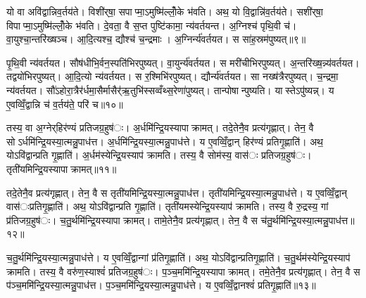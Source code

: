 
यो वा अवि॑द्वान्निव॒र्तय॑ते। विशी॑र्‌षा॒ सपाप्मा॒ऽमुष्मि॑ल्लोँ॒के भ॑वति। अथ॒ यो वि॒द्वान्नि॑व॒र्तय॑ते। सशी॑र्‌षा॒ विपाप्मा॒ऽमुष्मि॑ल्लोँ॒के भ॑वति। दे॒वता॒ वै स॒प्त पुष्टि॑कामा॒ न्य॑वर्तयन्त। अ॒ग्निश्च॑ पृथि॒वी च॑। वा॒युश्चा॒न्तरि॑ख्षञ्च। आ॒दि॒त्यश्च॒ द्यौश्च॑ च॒न्द्रमाः। अ॒ग्निर्न्य॑वर्तयत। स सा॑ह॒स्रम॑पुष्यत्॥९॥

पृ॒थि॒वी न्य॑वर्तयत। सौष॑धीभि॒र्वन॒स्पति॑भिरपुष्यत्। वा॒युर्न्य॑वर्तयत। स मरी॑चीभिरपुष्यत्। अ॒न्तरि॑ख्ष॒न्न्य॑वर्तयत। तद्वयो॑भिरपुष्यत्। आ॒दि॒त्यो न्य॑वर्तयत। स र॒श्मिभि॑रपुष्यत्। द्यौर्न्य॑वर्तयत। सा नख्ष॑त्रैरपुष्यत्। च॒न्द्रमा॒ न्य॑वर्तयत। सौ॑ऽहोरा॒त्रैर॑र्धमा॒सैर्मासैर्॑ऋ॒तुभि॑स्सव्वँथ्स॒रेणा॑पुष्यत्। तान्पोषान्पुष्यति। यास्तेऽपु॑ष्यन्न्। य ए॒वव्विँ॒द्वान्नि च॑ व॒र्तय॑ते॒ परि॑ च॥१०॥


तस्य॒ वा अ॒ग्नेर्‌हिर॑ण्यं प्रतिजग्र॒हुष॑ः। अ॒र्धमि॑न्द्रि॒यस्यापाक्रामत्। तदे॒तेनै॒व प्रत्य॑गृह्णात्। तेन॒ वै सोऽर्धमि॑न्द्रि॒यस्या॒त्मन्नु॒पाध॑त्त। अ॒र्धमि॑न्द्रि॒यस्या॒त्मन्नु॒पाध॑त्ते। य ए॒वव्विँ॒द्वान् हिर॑ण्यं प्रतिगृ॒ह्णाति॑। अथ॒ योऽवि॑द्वान्प्रति गृ॒ह्णाति॑। अ॒र्धम॑स्येन्द्रि॒यस्याप॑ क्रामति। तस्य॒ वै सोम॑स्य॒ वास॑ः प्रतिजग्र॒हुष॑ः। तृती॑यमिन्द्रि॒यस्यापाक्रामत्॥११॥

तदे॒तेनै॒व प्रत्य॑गृह्णात्। तेन॒ वै स तृती॑यमिन्द्रि॒यस्या॒त्मन्नु॒पाध॑त्त। तृती॑यमिन्द्रि॒यस्या॒त्मन्नु॒पाध॑त्ते। य ए॒वव्विँ॒द्वान् वास॑ःप्रतिगृ॒ह्णाति॑। अथ॒ योऽवि॑द्वान्प्रति गृ॒ह्णाति॑। तृती॑यमस्येन्द्रि॒यस्याप॑ क्रामति। तस्य॒ वै रु॒द्रस्य॒ गां प्र॑तिजग्र॒हुष॑ः। च॒तु॒र्थमि॑न्द्रि॒यस्यापाक्रामत्। तामे॒तेनै॒व प्रत्य॑गृह्णात्। तेन॒ वै स च॑तु॒र्थमि॑न्द्रि॒यस्या॒त्मन्नु॒पाध॑त्त॥१२॥

च॒तु॒र्थमि॑न्द्रि॒यस्या॒त्मन्नु॒पाध॑त्ते। य ए॒वव्विँ॒द्वान्गां प्र॑तिगृ॒ह्णाति॑। अथ॒ योऽवि॑द्वान्प्रतिगृ॒ह्णाति॑। च॒तु॒र्थम॑स्येन्द्रि॒यस्याप॑ क्रामति। तस्य॒ वै वरु॑ण॒स्याश्वं॑ प्रतिजग्र॒हुष॑ः। प॒ञ्च॒ममि॑न्द्रि॒यस्यापाक्रामत्। तमे॒तेनै॒व प्रत्य॑गृह्णात्। तेन॒ वै स प॑ञ्च॒ममि॑न्द्रि॒यस्या॒त्मन्नु॒पाध॑त्त। प॒ञ्च॒ममि॑न्द्रि॒यस्या॒त्मन्नु॒पाध॑त्ते। य ए॒वव्विँ॒द्वानश्वं॑ प्रतिगृ॒ह्णाति॑॥१३॥

